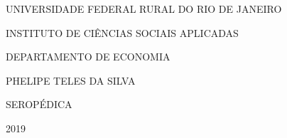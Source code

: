 \documentclass[a4paper,
               article,
               12pt,
               openany,
               oneside,
               english,
               brazil]{abntex2}
\numberwithin{equation}{section}
\begin{document}
\renewcommand{\imprimircapa}{%
    \begin{capa}%
        \center

        \ABNTEXchapterfont
        \large UNIVERSIDADE FEDERAL RURAL DO RIO DE JANEIRO

        \large INSTITUTO DE CIÊNCIAS SOCIAIS APLICADAS

        \large DEPARTAMENTO DE ECONOMIA
        \vfill

        \begin{center}
            \large PHELIPE TELES DA SILVA
        \end{center}

        \vfill
        \begin{center}
            \ABNTEXchapterfont
            \bfseries
            \large \imprimirtitulo
        \end{center}
        \vfill
        \large SEROPÉDICA

        \large 2019
        \vspace*{1cm}
    \end{capa}}
\imprimircapa


\imprimirfolhaderosto
\end{document}
